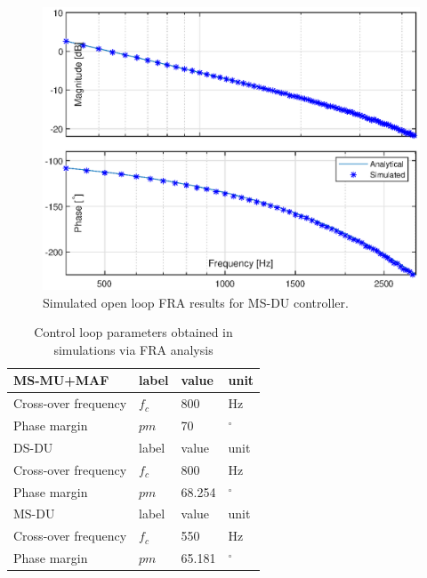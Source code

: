 \documentclass[journal]{IEEEtran}
\begin{document}
\begin{figure}[t!]
    \centerline{\includegraphics[width=0.95\linewidth]{figures/MSDU_olfra.eps}}
    \caption{Simulated open loop FRA results for MS-DU controller.}
    \label{fig:MSDU_olfra} 
\end{figure}

\begin{table}[h!]
			  \caption{Control loop parameters obtained in simulations via FRA analysis}
              \label{tab:sym_param}
              \centering
              \begin{tabular}{llll}
                           \midrule\midrule
        MS-MU+MAF & label & value   & unit\\
        \midrule               
                  Cross-over frequency  & $f_{c}$ & 800 & Hz   \\
                  Phase margin  & $pm$ & 70 &  $^\circ$  \\
                  \midrule\midrule
        DS-DU & label & value   & unit\\
        \midrule               
                  Cross-over frequency  & $f_{c}$ & 800 & Hz   \\
                  Phase margin  & $pm$ & 68.254 &  $^\circ$  \\
                  \midrule\midrule
        MS-DU & label & value   & unit\\
        \midrule               
                  Cross-over frequency  & $f_{c}$ & 550 & Hz   \\
                  Phase margin  & $pm$ & 65.181 &  $^\circ$  \\
                  \midrule\midrule
                                                        
              \end{tabular}
\end{table}
\end{document}
